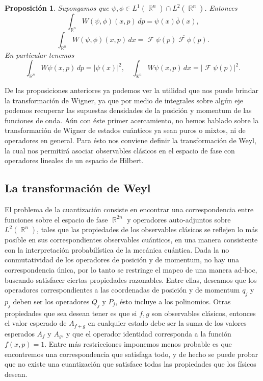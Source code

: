 \documentclass[a4paper]{report}
\DeclareMathOperator{\R}{\mathbb{R}}
\DeclareMathOperator{\F}{\mathcal{F}}
\newtheorem{proposition}{Proposición}
\begin{document}
  \begin{proposition}
    Supongamos que $\psi, \phi \in L^{1}(\R^{n}) \cap
    L^2(\R^{n})$. Entonces
    \begin{equation}
      \int_{\R^{n}} W(\psi,\phi)(x,p) \, dp
      = \psi(x)\overline{\phi}(x),
    \end{equation}
    \begin{equation}
      \int_{\R^{n}} W(\psi,\phi)(x,p) \, dx
      = \F\psi(p) \overline{\F\phi}(p).
    \end{equation}
    En particular tenemos
    \begin{equation}
      \int_{\R^{n}} W\psi(x,p) \, dp
      = |\psi(x)|^2,
      \quad
      \int_{\R^{n}} W\psi(x,p) \, dx
      = |\F\psi(p)|^2.
    \end{equation}
  \end{proposition}
  De las proposiciones anteriores ya podemos ver la utilidad
  que nos puede brindar la transformación de Wigner, ya que
  por medio de integrales sobre algún eje podemos recuperar
  las supuestas densidades de la posición y momentum de las
  funciones de onda. Aún con éste primer acercamiento, no
  hemos hablado sobre la transformación de Wigner de estados
  cuánticos ya sean puros o mixtos, ni de operadores en
  general. Para ésto nos conviene definir la transformación
  de Weyl, la cual nos permitirá asociar observables
  clásicos en el espacio de fase con operadores lineales de
  un espacio de Hilbert.

  \subsection{La transformación de Weyl}

  El problema de la cuantización consiste en encontrar una
  correspondencia entre funciones sobre el espacio de fase
  $\R^{2n}$ y operadores auto-adjuntos sobre $L^2(\R^{n})$,
  tales que las propiedades de los observables clásicos se
  reflejen lo más posible en sus correspondientes
  observables cuánticos, en una manera consistente con la
  interpretación probabilística de la mecánica cuántica.
  Dada la no conmutatividad de los operadores de posición y
  de momentum, no hay una correspondencia única, por lo
  tanto se restringe el mapeo de una manera ad-hoc, buscando
  satisfacer ciertas propiedades razonables. Entre ellas,
  deseamos que los operadores correspondientes a las
  coordenadas de posición y de momentum $q_j$ y $p_j$ deben
  ser los operadores $Q_j$ y $P_j$, ésto incluye a los
  polinomios. Otras propiedades que sea desean tener es que
  si $f,g$ son observables clásicos, entonces el valor
  esperado de $A_{f+g}$ en cualquier estado debe ser la suma
  de los valores esperados  $A_f$ y $A_g$, y que el operador
  identidad corresponda a la función $f(x,p) = 1$. Entre más
  restricciones imponemos menos probable es que encontremos
  una correspondencia que satisfaga todo, y de hecho se
  puede probar que no existe una cuantización que satisface
  todas las propiedades que los físicos desean. 
\end{document}
